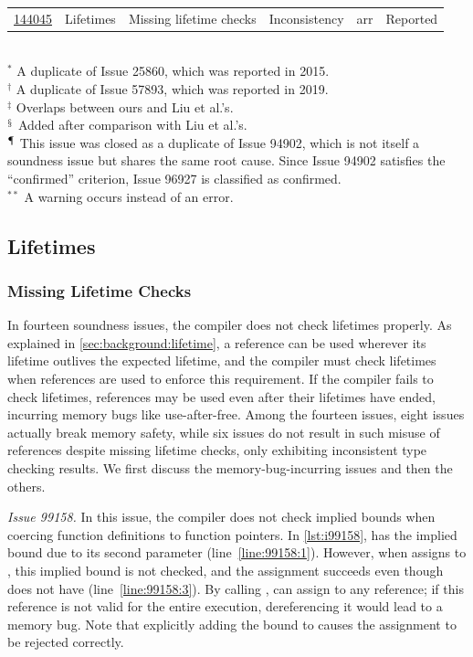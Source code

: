 \begin{table}[t]
{\begin{tabular}{l|l|l|l|l|l}
\href{https://github.com/rust-lang/rust/issues/144045}{144045}&Lifetimes&Missing lifetime checks&Inconsistency&arr&Reported\\
\end{tabular}
  \\[-0.1em] $^\ast$ A duplicate of Issue 25860, which was reported in 2015.
  \\[-0.1em] $^\dag$ A duplicate of Issue 57893, which was reported in 2019.
  \\[-0.1em] $^\ddag$ Overlaps between ours and Liu et al.'s.
  \\[-0.1em] $^\mathsection$ Added after comparison with Liu et al.'s.
  \\[-0.1em] $^\mathparagraph$ This issue was closed as a duplicate of Issue 94902,
  which is not itself a soundness issue but shares the same root cause.
  Since Issue 94902 satisfies the ``confirmed'' criterion, Issue 96927 is
  classified as confirmed.
  \\[-0.6em] $^{\ast\ast}$ A warning occurs instead of an error.
  }
\vspace{-1.5em}
\end{table}

\subsection{Lifetimes}

\subsubsection{Missing Lifetime Checks}

In fourteen soundness issues, the compiler does not check lifetimes properly.
%
As explained in \cref{sec:background:lifetime}, a reference can be used wherever
its lifetime outlives the expected lifetime, and the compiler must check
lifetimes when references are used to enforce this requirement.
%
If the compiler fails to check lifetimes, references may be used even after
their lifetimes have ended, incurring memory bugs like use-after-free.
%
Among the fourteen issues, eight issues actually break memory safety, while six
issues do not result in such misuse of references despite missing lifetime
checks, only exhibiting inconsistent type checking results.
%
We first discuss the memory-bug-incurring issues and then the others.

{\it Issue 99158.}
%
In this issue, the compiler does not check implied bounds when coercing function
definitions to function pointers.
%
In \cref{lst:i99158},  has the implied bound  due to its
second parameter (line~\ref{line:99158:1}).
%
However, when  assigns  to , this implied bound is not
checked, and the assignment succeeds even though  does not have  (line~\ref{line:99158:3}).
%
By calling ,  can assign  to any reference;
%
if this reference is not valid for the entire execution, dereferencing it would
lead to a memory bug.
%
Note that explicitly adding the bound  to  causes the
assignment to be rejected correctly.

